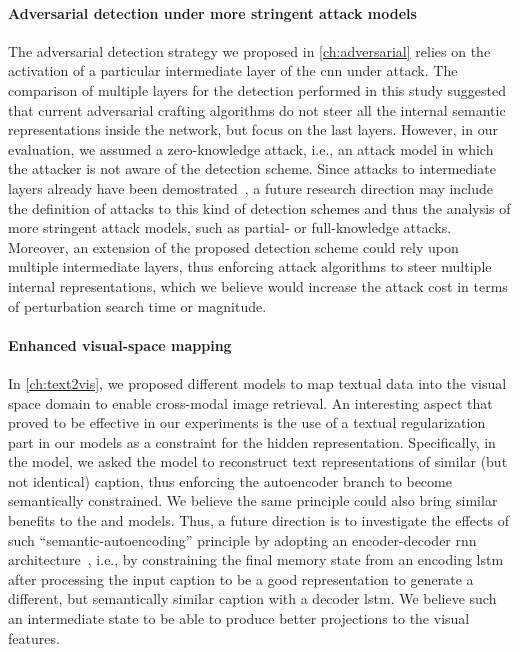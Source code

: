 \paragraph{Adversarial detection under more stringent attack models}
The adversarial detection strategy we proposed in \ref{ch:adversarial} relies on the activation of a particular intermediate layer of the \gls{cnn} under attack.
The comparison of multiple layers for the detection performed in this study suggested that current adversarial crafting algorithms do not steer all the internal semantic representations inside the network, but focus on the last layers.
However, in our evaluation, we assumed a zero-knowledge attack, i.e., an attack model in which the attacker is not aware of the detection scheme.
Since attacks to intermediate layers already have been demostrated~\cite{sabour2015adversarial}, a future research direction may include the definition of attacks to this kind of detection schemes and thus the analysis of more stringent attack models, such as partial- or full-knowledge attacks.
Moreover, an extension of the proposed detection scheme could rely upon multiple intermediate layers, thus enforcing attack algorithms to steer multiple internal representations, which we believe would increase the attack cost in terms of perturbation search time or magnitude.

\paragraph{Enhanced visual-space mapping}
In \ref{ch:text2vis}, we proposed different models to map textual data into the visual space domain to enable cross-modal image retrieval.
An interesting aspect that proved to be effective in our experiments is the use of a textual regularization part in our models as a constraint for the hidden representation.
Specifically, in the \sparsettv{} model, we asked the model to reconstruct text representations of similar (but not identical) caption, thus enforcing the autoencoder branch to become semantically constrained.
We believe the same principle could also bring similar benefits to the \densettv{} and \widedeepttv{} models.
Thus, a future direction is to investigate the effects of such ``semantic-autoencoding'' principle by adopting an encoder-decoder \gls{rnn} architecture~\cite{cho2014learning}, i.e.,  by constraining the final memory state from an encoding \gls{lstm} after processing the input caption to be a good representation to generate a different, but semantically similar caption with a decoder \gls{lstm}.
We believe such an intermediate state to be able to produce better projections to the visual features.

